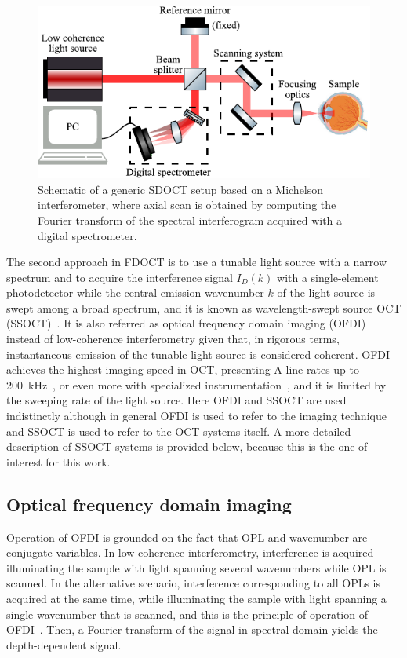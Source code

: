 \begin{figure}[htb!]
    \centering
    \includegraphics[width=.75\textwidth]{Figures/TheoreticalBasis/SDOCT_Scheme.pdf}
    \caption[Schematic of a generic SDOCT setup based on a Michelson interferometer.]{Schematic of a generic SDOCT setup based on a Michelson interferometer, where axial scan is obtained by computing the Fourier transform of the spectral interferogram acquired with a digital spectrometer.}
    \label{fig:SDOCT_Scheme}
\end{figure}

The second approach in FDOCT is to use a tunable light source with a narrow spectrum and to acquire the interference signal $I_D(k)$ with a single-element photodetector while the central emission wavenumber $k$ of the light source is swept among a broad spectrum, and it is known as wavelength-swept source OCT (SSOCT)~\cite{Chinn1997_Optical, Yun2003_Highspeed}. It is also referred as optical frequency domain imaging (OFDI)~\cite{Bouma2015_Optical} instead of low-coherence interferometry given that, in rigorous terms, instantaneous emission of the tunable light source is considered coherent. OFDI achieves the highest imaging speed in OCT, presenting A-line rates up to 200~kHz~\cite{Okabe2012_200}, or even more with specialized instrumentation~\cite{Oh2010_400}, and it is limited by the sweeping rate of the light source. Here OFDI and SSOCT are used indistinctly although in general OFDI is used to refer to the imaging technique and SSOCT is used to refer to the OCT systems itself. A more detailed description of SSOCT systems is provided below, because this is the one of interest for this work.

\subsection{Optical frequency domain imaging}

Operation of OFDI is grounded on the fact that OPL and wavenumber are conjugate variables. In low-coherence interferometry, interference is acquired illuminating the sample with light spanning several wavenumbers while OPL is scanned. In the alternative scenario, interference corresponding to all OPLs is acquired  at the same time, while illuminating the sample with light spanning a single wavenumber that is scanned, and this is the principle of operation of OFDI~\cite{Yun2003_Highspeed}. Then, a Fourier transform of the signal in spectral domain yields the depth-dependent signal.

